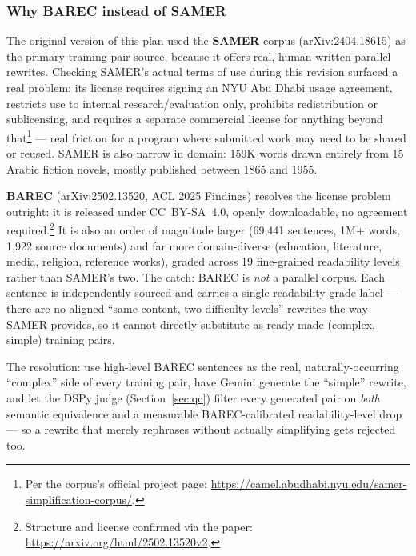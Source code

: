 \documentclass[11pt,a4paper]{article}
\begin{document}
\subsubsection{Why BAREC instead of SAMER}
\label{sec:why-barec}

The original version of this plan used the \textbf{SAMER} corpus
(arXiv:2404.18615) as the primary training-pair source, because it offers real,
human-written parallel rewrites. Checking SAMER's actual terms of use during
this revision surfaced a real problem: its license requires signing an NYU Abu
Dhabi usage agreement, restricts use to internal research/evaluation only,
prohibits redistribution or sublicensing, and requires a separate commercial
license for anything beyond that\footnote{Per the corpus's official project
page: \url{https://camel.abudhabi.nyu.edu/samer-simplification-corpus/}.} ---
real friction for a program where submitted work may need to be shared or
reused. SAMER is also narrow in domain: 159K words drawn entirely from 15
Arabic fiction novels, mostly published between 1865 and 1955.

\textbf{BAREC} (arXiv:2502.13520, ACL 2025 Findings) resolves the license
problem outright: it is released under CC~BY-SA~4.0, openly downloadable, no
agreement required.\footnote{Structure and license confirmed via the paper:
\url{https://arxiv.org/html/2502.13520v2}.} It is also an order of magnitude
larger (69,441 sentences, 1M+ words, 1,922 source documents) and far more
domain-diverse (education, literature, media, religion, reference works),
graded across 19 fine-grained readability levels rather than SAMER's two. The
catch: BAREC is \emph{not} a parallel corpus. Each sentence is independently
sourced and carries a single readability-grade label --- there are no aligned
``same content, two difficulty levels'' rewrites the way SAMER provides, so it
cannot directly substitute as ready-made (complex, simple) training pairs.

The resolution: use high-level BAREC sentences as the real, naturally-occurring
``complex'' side of every training pair, have Gemini generate the ``simple''
rewrite, and let the DSPy judge (Section~\ref{sec:qc}) filter every generated
pair on \emph{both} semantic equivalence and a measurable BAREC-calibrated
readability-level drop --- so a rewrite that merely rephrases without actually
simplifying gets rejected too.
\end{document}
